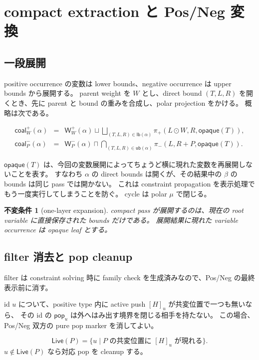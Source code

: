 \documentclass[uplatex,dvipdfmx,a4paper,10.5pt]{jsarticle}
\theoremstyle{jpplain}
\newtheorem{invariant}[definition]{不変条件}
\newcommand{\lb}{\mathsf{lb}}
\newcommand{\ub}{\mathsf{ub}}
\newcommand{\coal}{\mathsf{coal}}
\newcommand{\projp}{\pi_{+}}
\newcommand{\projn}{\pi_{-}}
\newcommand{\PWeight}[2]{\mathsf{W}^{+}_{#1}(#2)}
\newcommand{\NWeight}[2]{\mathsf{W}^{-}_{#1}(#2)}
\newcommand{\takeop}[2]{[#1]_{#2}}
\newcommand{\popop}[1]{\mathsf{pop}_{#1}}
\newcommand{\live}{\mathsf{Live}}
\newcommand{\opq}{\mathsf{opaque}}
\begin{document}
\section{compact extraction と Pos/Neg 変換}

\subsection{一段展開}

positive occurrence の変数は lower bounds、negative occurrence は upper bounds から展開する。
parent weight を $W$ とし、direct bound $(T,L,R)$ を開くとき、先に parent と bound の重みを合成し、polar projection をかける。
概略は次である。

\[
\begin{array}{rcl}
\coal^+_W(\alpha)
 &=& \PWeight{W}{\alpha}
 \sqcup
 \displaystyle\bigsqcup_{(T,L,R)\in\lb(\alpha)}
 \projp(L\odot W,R,\opq(T)),\\[1ex]
\coal^-_P(\alpha)
 &=& \NWeight{P}{\alpha}
 \sqcap
 \displaystyle\bigcap_{(T,L,R)\in\ub(\alpha)}
 \projn(L,R+P,\opq(T)).
\end{array}
\]

$\opq(T)$ は、今回の変数展開によってちょうど横に現れた変数を再展開しないことを表す。
すなわち $\alpha$ の direct bounds は開くが、その結果中の $\beta$ の bounds は同じ pass では開かない。
これは constraint propagation を表示処理でもう一度実行してしまうことを防ぐ。
cycle は polar $\mu$ で閉じる。

\begin{invariant}[one-layer expansion]
compact pass が展開するのは、現在の root variable に直接保存された bounds だけである。
展開結果に現れた variable occurrence は opaque leaf とする。
\end{invariant}

\subsection{filter 消去と pop cleanup}

filter は constraint solving 時に family check を生成済みなので、Pos/Neg の最終表示前に消す。

id $u$ について、positive type 内に active push $\takeop{H}{u}$ が共変位置で一つも無いなら、
その id の $\popop{u}$ は外へはみ出す境界を閉じる相手を持たない。
この場合、Pos/Neg 双方の pure pop marker を消してよい。

\[
  \live(P)=\{u\mid P\text{ の共変位置に }\takeop{H}{u}\text{ が現れる}\}.
\]
$u\notin\live(P)$ なら対応 pop を cleanup する。
\end{document}
